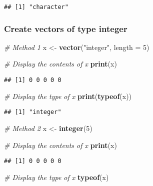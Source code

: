 \documentclass[
]{article}
\newenvironment{Shaded}{\begin{snugshade}}{\end{snugshade}}
\newcommand{\AttributeTok}[1]{\textcolor[rgb]{0.13,0.29,0.53}{#1}}
\newcommand{\CommentTok}[1]{\textcolor[rgb]{0.56,0.35,0.01}{\textit{#1}}}
\newcommand{\DecValTok}[1]{\textcolor[rgb]{0.00,0.00,0.81}{#1}}
\newcommand{\FunctionTok}[1]{\textcolor[rgb]{0.13,0.29,0.53}{\textbf{#1}}}
\newcommand{\NormalTok}[1]{#1}
\newcommand{\OtherTok}[1]{\textcolor[rgb]{0.56,0.35,0.01}{#1}}
\newcommand{\StringTok}[1]{\textcolor[rgb]{0.31,0.60,0.02}{#1}}
\begin{document}
\begin{verbatim}
## [1] "character"
\end{verbatim}

\hypertarget{create-vectors-of-type-integer}{%
\subsubsection{Create vectors of type
integer}\label{create-vectors-of-type-integer}}

\begin{Shaded}
\begin{Highlighting}[]
\CommentTok{\# Method 1}
\NormalTok{x }\OtherTok{\textless{}{-}} \FunctionTok{vector}\NormalTok{(}\StringTok{"integer"}\NormalTok{, }\AttributeTok{length =} \DecValTok{5}\NormalTok{)}

\CommentTok{\# Display the contents of x}
\FunctionTok{print}\NormalTok{(x)}
\end{Highlighting}
\end{Shaded}

\begin{verbatim}
## [1] 0 0 0 0 0
\end{verbatim}

\begin{Shaded}
\begin{Highlighting}[]
\CommentTok{\# Display the type of x}
\FunctionTok{print}\NormalTok{(}\FunctionTok{typeof}\NormalTok{(x))}
\end{Highlighting}
\end{Shaded}

\begin{verbatim}
## [1] "integer"
\end{verbatim}

\begin{Shaded}
\begin{Highlighting}[]
\CommentTok{\# Method 2}
\NormalTok{x }\OtherTok{\textless{}{-}} \FunctionTok{integer}\NormalTok{(}\DecValTok{5}\NormalTok{)}

\CommentTok{\# Display the contents of x}
\FunctionTok{print}\NormalTok{(x)}
\end{Highlighting}
\end{Shaded}

\begin{verbatim}
## [1] 0 0 0 0 0
\end{verbatim}

\begin{Shaded}
\begin{Highlighting}[]
\CommentTok{\# Display the type of x}
\FunctionTok{typeof}\NormalTok{(x)}
\end{Highlighting}
\end{Shaded}
\end{document}
